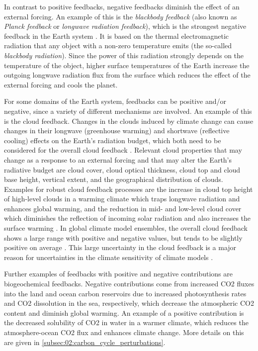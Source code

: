 In contrast to positive feedbacks, negative feedbacks diminish the effect of an
external forcing. An example of this is the \emph{blackbody feedback} (also
known as \emph{Planck feedback} or \emph{longwave radiation feedback}), which
is the strongest negative feedback in the Earth system \autocite{Cubasch2013}.
It is based on the thermal electromagnetic radiation that any object with a
non-zero temperature emits (the so-called \emph{blackbody radiation}). Since
the power of this radiation strongly depends on the temperature of the object,
higher surface temperatures of the Earth increase the outgoing longwave
radiation flux from the surface which reduces the effect of the external
forcing and cools the planet.

For some domains of the Earth system, feedbacks can be positive and/or
negative, since a variety of different mechanisms are involved. An example of
this is the cloud feedback. Changes in the clouds induced by climate change can
cause changes in their longwave (greenhouse warming) and shortwave (reflective
cooling) effects on the Earth's radiation budget, which both need to be
considered for the overall cloud feedback \autocite{Boucher2013}. Relevant
cloud properties that may change as a response to an external forcing and that
may alter the Earth's radiative budget are cloud cover, cloud optical
thickness, cloud top and cloud base height, vertical extent, and the
geographical distribution of clouds. Examples for robust cloud feedback
processes are the increase in cloud top height of high-level clouds in a
warming climate which traps longwave radiation and enhances global warming, and
the reduction in mid- and low-level cloud cover which diminishes the reflection
of incoming solar radiation and also increases the surface warming
\autocite{Boucher2013}. In global climate model ensembles, the overall cloud
feedback shows a large range with positive and negative values, but tends to be
slightly positive on average \autocite{Soden2006, Dufresne2008, Vial2013,
  Zelinka2020}. This large uncertainty in the cloud feedback is a major reason
for uncertainties in the climate sensitivity of climate models
\autocite{Boucher2013, Flato2013}.

Further examples of feedbacks with positive and negative contributions are
biogeochemical feedbacks. Negative contributions come from increased \ac{CO2}
fluxes into the land and ocean carbon reservoirs due to increased
photosynthesis rates and \ac{CO2} dissolution in the sea, respectively, which
decrease the atmospheric \ac{CO2} content and diminish global warming. An
example of a positive contribution is the decreased solubility of \ac{CO2} in
water in a warmer climate, which reduces the atmosphere-ocean \ac{CO2} flux and
enhances climate change. More details on this are given in
\cref{subsec:02:carbon_cycle_perturbations}.


